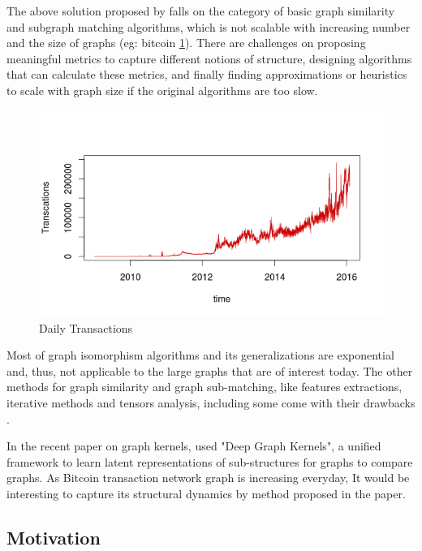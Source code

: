 \documentclass[12pt,a4paper]{article}
\numberwithin{equation}{section}
\numberwithin{figure}{section}
\numberwithin{table}{section}
\begin{document}
The above solution proposed by \citet{Kondor2014} falls on the category of basic graph similarity and subgraph matching algorithms, which is not scalable with increasing number and the size of graphs (eg: bitcoin \ref{fig:transactions}). There are challenges on proposing meaningful metrics to capture different notions of structure, designing algorithms that can calculate these metrics, and finally finding approximations or heuristics to scale with graph size if the original algorithms are too slow.

\begin{figure}[ht]
\begin{center}
\includegraphics[width=\textwidth]{./figure/transactions.png}
\caption{Daily Transactions}
\label{fig:transactions}
\end{center}
\end{figure}

Most of graph isomorphism algorithms and its generalizations are exponential and, thus, not applicable to the large graphs that are of interest today. The other methods  for graph similarity and graph sub-matching, like features extractions, iterative methods and tensors analysis, including some come with their drawbacks \citep{Zager2008}.

In the recent paper on graph kernels, \citet{Yanardag2015} used "Deep Graph Kernels", a unified framework to learn latent representations of sub-structures for graphs to compare graphs. As Bitcoin transaction network graph is increasing everyday, It would be interesting to capture its structural dynamics by method proposed in the paper.


\subsection{Motivation}
\label{subsec:Motivation}
\end{document}
